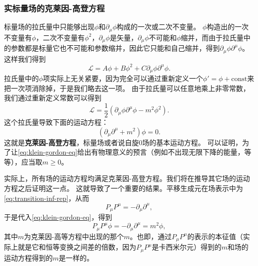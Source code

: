 \documentclass[hyperref, UTF8, a4paper]{ctexart}
\newcommand*{\const}{\mathrm{const}}
\renewcommand{\autoref}{\prettyref}
\begin{document}
\subsubsection{实标量场的克莱因-高登方程}\label{sec:k-g-eq}

标量场的拉氏量中只能够出现$\phi$和$\partial_\mu \phi$构成的一次或二次不变量。
$\phi$构造出的一次不变量有$\phi$，二次不变量有$\phi^2$，$\partial_\mu \phi$是矢量，$\partial_\mu \phi$不可能和$\phi$缩并，而由于拉氏量中的参数都是标量它也不可能和参数缩并，因此它只能和自己缩并，得到$\partial_\mu \phi \partial^\mu \phi$。
这样我们得到
\[
    \mathcal{L} = A \phi + B \phi^2 + C \partial_\mu \phi \partial^\mu \phi.
\]
拉氏量中的$\phi$项实际上无关紧要，因为完全可以通过重新定义一个$\phi' = \phi + \const$来把一次项消除掉，于是我们略去这一项。
由于拉氏量可以任意地乘上非零常数，我们通过重新定义常数可以得到
\begin{equation}
    \mathcal{L} = \frac{1}{2} (\partial_\mu \phi \partial^\mu \phi - m^2 \phi^2).
    \label{eq:klein-gordon-lagrangian}
\end{equation}
这个拉氏量导致下面的运动方程：
\begin{equation}
    (\partial_\mu \partial^\mu + m^2) \phi = 0.
    \label{eq:klein-gordon-eq}
\end{equation}
这就是\textbf{克莱因-高登方程}，标量场或者说自旋0场的基本运动方程。
可以证明，为了让\eqref{eq:klein-gordon-eq}给出有物理意义的预言（例如不出现无限下降的能量，等等），应当取$m \geq 0$。

实际上，所有场的运动方程均满足克莱因-高登方程。我们将在推导其它场的运动方程之后证明这一点。
这就导致了一个重要的结果。平移生成元在场表示中为\eqref{eq:transition-inf-rep}，从而
\[
    P_\mu P^\mu = - \partial_\mu \partial^\mu,
\]
于是代入\eqref{eq:klein-gordon-eq}，得到
\[
    P_\mu P^\mu \phi = - \partial_\mu \partial^\mu = m^2 \phi,
\]
其中$m$为克莱因-高等方程中出现的那个$m$。也即，通过$P_\mu P^\mu$的表示的本征值（实际上就是它和恒等变换之间差的倍数，因为$P_\mu P^\mu$是卡西米尔元）得到的$m$和场的运动方程得到的$m$是一样的。
\end{document}
